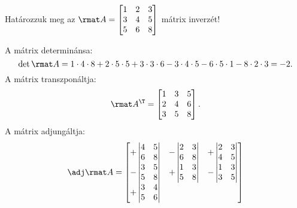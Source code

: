 \documentclass[a4paper, 12pt]{scrartcl}
\begin{document}
\begin{example}
  Határozzuk meg az $\rmat A = \begin{bmatrix}
      1 & 2 & 3 \\
      3 & 4 & 5 \\
      5 & 6 & 8 \\
    \end{bmatrix}$ mátrix inverzét!

  A mátrix determinánsa:
  $$
    \det \rmat A
    = 1 \cdot 4 \cdot 8
    + 2 \cdot 5 \cdot 5
    + 3 \cdot 3 \cdot 6
    - 3 \cdot 4 \cdot 5
    - 6 \cdot 5 \cdot 1
    - 8 \cdot 2 \cdot 3
    = -2
    \text.
  $$
  A mátrix transzponáltja:
  $$
    \rmat A^\T = \begin{bmatrix}
      1 & 3 & 5 \\
      2 & 4 & 6 \\
      3 & 5 & 8
    \end{bmatrix}
    \text.
  $$
  A mátrix adjungáltja:
  $$
    \adj \rmat A = \begin{bmatrix}
      + \begin{vmatrix}
          4 & 5 \\
          6 & 8
        \end{vmatrix}
       &
      - \begin{vmatrix}
          2 & 3 \\
          6 & 8
        \end{vmatrix}
       &
      + \begin{vmatrix}
          2 & 3 \\
          4 & 5
        \end{vmatrix}
      \\
      - \begin{vmatrix}
          3 & 5 \\
          5 & 8
        \end{vmatrix}
       &
      + \begin{vmatrix}
          1 & 3 \\
          5 & 8
        \end{vmatrix}
       &
      - \begin{vmatrix}
          1 & 3 \\
          3 & 5
        \end{vmatrix}
      \\
      + \begin{vmatrix}
          3 & 4 \\
          5 & 6
        \end{vmatrix}

\end{bmatrix}$$
\end{example}
\end{document}
